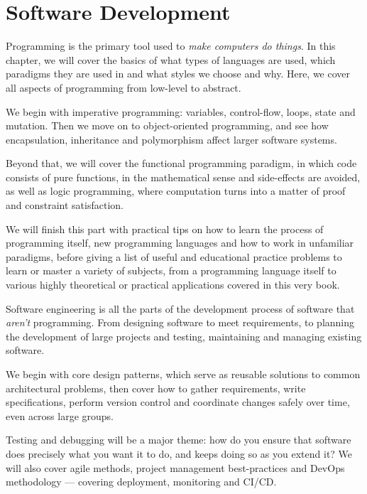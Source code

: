 \section{Software Development}
\begin{itemize}
  Programming is the primary tool used to \emph{make computers do things}.
  In this chapter, we will cover the basics of what types of languages are used,
  which paradigms they are used in and what styles we choose and why. Here, we
  cover all aspects of programming from low-level to abstract.

  We begin with imperative programming: variables, control-flow, loops, state
  and mutation. Then we move on to object-oriented programming, and see how
  encapsulation, inheritance and polymorphism affect larger software systems.

  Beyond that, we will cover the functional programming paradigm, in which
  code consists of pure functions, in the mathematical sense and side-effects
  are avoided, as well as logic programming, where computation turns into a
  matter of proof and constraint satisfaction.

  We will finish this part with practical tips on how to learn the process of
  programming itself, new programming languages and how to work in unfamiliar
  paradigms, before giving a list of useful and educational practice problems
  to learn or master a variety of subjects, from a programming language itself
  to various highly theoretical or practical applications covered in this very
  book.

  Software engineering is all the parts of the development process of software
  that \emph{aren't} programming. From designing software to meet requirements,
  to planning the development of large projects and testing, maintaining and
  managing existing software.

  We begin with core design patterns, which serve as reusable solutions to
  common architectural problems, then cover how to gather requirements,
  write specifications, perform version control and coordinate changes safely
  over time, even across large groups.

  Testing and debugging will be a major theme: how do you ensure that software
  does precisely what you want it to do, and keeps doing so as you extend it?
  We will also cover agile methods, project management best-practices and DevOps
  methodology --- covering deployment, monitoring and CI/CD.\@


\end{itemize}

